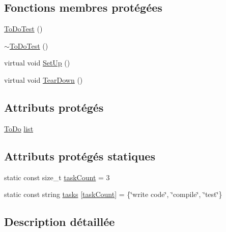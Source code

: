 \subsection*{Fonctions membres protégées}
\begin{DoxyCompactItemize}
\item 
\hyperlink{class_to_do_core_1_1testing_1_1_to_do_test_ae616fd99cc5a805ca5e7dfd01161f838}{To\+Do\+Test} ()
\item 
\hyperlink{class_to_do_core_1_1testing_1_1_to_do_test_a60215b4387d7543fe3d8b95a4ea68efb}{$\sim$\+To\+Do\+Test} ()
\item 
virtual void \hyperlink{class_to_do_core_1_1testing_1_1_to_do_test_a7c6934ff5c428bbf570ba84a236c8ea8}{Set\+Up} ()
\item 
virtual void \hyperlink{class_to_do_core_1_1testing_1_1_to_do_test_a20a3f1fa62263094c32fed4460592a16}{Tear\+Down} ()
\end{DoxyCompactItemize}
\subsection*{Attributs protégés}
\begin{DoxyCompactItemize}
\item 
\hyperlink{class_to_do_core_1_1_to_do}{To\+Do} \hyperlink{class_to_do_core_1_1testing_1_1_to_do_test_aa574f1ef8dce28e299d993d06a0bbba9}{list}
\end{DoxyCompactItemize}
\subsection*{Attributs protégés statiques}
\begin{DoxyCompactItemize}
\item 
static const size\+\_\+t \hyperlink{class_to_do_core_1_1testing_1_1_to_do_test_a9f8905b1176e6183f287ab0afe296a3c}{task\+Count} = 3
\item 
static const string \hyperlink{class_to_do_core_1_1testing_1_1_to_do_test_a6ef770d8f95f609e100d585c0635f3d7}{tasks} \mbox{[}\hyperlink{class_to_do_core_1_1testing_1_1_to_do_test_a9f8905b1176e6183f287ab0afe296a3c}{task\+Count}\mbox{]} = \{\char`\"{}write code\char`\"{}, \char`\"{}compile\char`\"{}, \char`\"{}test\char`\"{}\}
\end{DoxyCompactItemize}


\subsection{Description détaillée}


